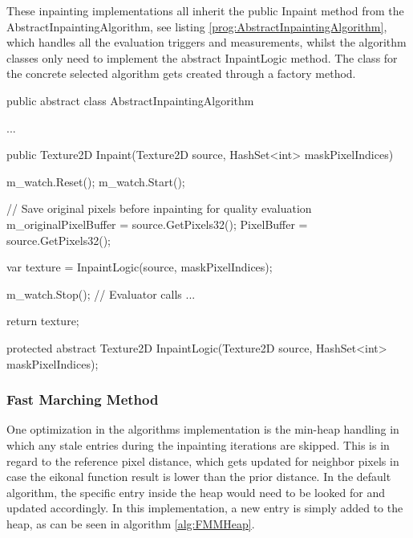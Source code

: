 These inpainting implementations all inherit the public Inpaint method from the AbstractInpaintingAlgorithm, see listing \ref{prog:AbstractInpaintingAlgorithm}, which handles all the evaluation triggers and measurements, whilst the algorithm classes only need to implement the abstract InpaintLogic method. The class for the concrete selected algorithm gets created through a factory method.

\begin{listing}[htb!]
\caption{AbstractInpaintingAlgorithm class, which all the inpainting implementation classes inherit from.}
\label{prog:AbstractInpaintingAlgorithm}
\begin{CsCodeCust}
public abstract class AbstractInpaintingAlgorithm {
    ...

    public Texture2D Inpaint(Texture2D source, HashSet<int> maskPixelIndices) {
        m_watch.Reset();
        m_watch.Start();

        // Save original pixels before inpainting for quality evaluation
        m_originalPixelBuffer = source.GetPixels32();
        PixelBuffer = source.GetPixels32();

        var texture = InpaintLogic(source, maskPixelIndices);

        m_watch.Stop();
        // Evaluator calls
        ...
        
        return texture;
    }

    protected abstract Texture2D InpaintLogic(Texture2D source, HashSet<int> maskPixelIndices);
}
\end{CsCodeCust}
\end{listing}

\subsubsection{Fast Marching Method}

One optimization in the algorithms implementation is the min-heap handling in which any stale entries during the inpainting iterations are skipped. This is in regard to the reference pixel distance, which gets updated for neighbor pixels in case the eikonal function result is lower than the prior distance. 
In the default algorithm, the specific entry inside the heap would need to be looked for and updated accordingly. In this implementation, a new entry is simply added to the heap, as can be seen in algorithm \ref{alg:FMMHeap}.

